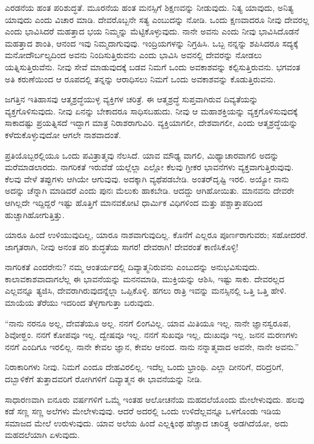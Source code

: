 ಎರಡನೆಯ ಹಂತ ಪರಿಶುದ್ಧತೆ. ಮೂರನೆಯ ಹಂತ ಮನಸ್ಸಿಗೆ ಶಿಕ್ಷಣವನ್ನು ನೀಡುವುದು. ನಿತ್ಯ ಯಾವುದು, ಅನಿತ್ಯ ಯಾವುದು ಎಂದು ವಿಚಾರ ಮಾಡಿ. ದೇವರೊಬ್ಬನೇ ಸತ್ಯ ಎಂಬುದನ್ನು ನೋಡಿ. ಒಂದು ಕ್ಷಣವಾದರೂ ನೀವು ದೇವರಲ್ಲ ಎಂದು ಭಾವಿಸಿದರೆ ಮಹತ್ತಾದ ಭಯ ನಿಮ್ಮನ್ನು ಮೆಟ್ಟಿಕೊಳ್ಳುವುದು. ನಾನೇ ಅವನು ಎಂದು ನೀವು ಭಾವಿಸಿದೊಡನೆ ಮಹತ್ತಾದ ಶಾಂತಿ, ಆನಂದ ಇವು ನಿಮ್ಮದಾಗುವುವು. ಇಂದ್ರಿಯಗಳನ್ನು ನಿಗ್ರಹಿಸಿ. ಒಬ್ಬ ನನ್ನನ್ನು ಶಪಿಸಿದರೂ ಸದ್ಯಕ್ಕೆ ಮನೋದೌರ್ಬಲ್ಯದಿಂದ ಅವನು ನಿಂದಿಸುತ್ತಿರುವನು ಎಂದು ಭಾವಿಸಿ ಅವನಲ್ಲಿ ದೇವರನ್ನು ನೋಡಲು ಯತ್ನಿಸುತ್ತಿರುವೆನು. ನೀವು ಸೇವೆ ಮಾಡುವುದಕ್ಕೆ ಬಡವ ನಿಮಗೆ ಒಂದು ಅವಕಾಶವನ್ನು ಕಲ್ಪಿಸುತ್ತಿರುವನು. ಭಗವಂತ ಅತಿ ಕರುಣೆಯಿಂದ ಆ ರೂಪದಲ್ಲಿ ತನ್ನನ್ನು ಆರಾಧಿಸಲು ನಿಮಗೆ ಒಂದು ಅವಕಾಶವನ್ನು ಕೊಡುತ್ತಿರುವನು.

ಜಗತ್ತಿನ ಇತಿಹಾಸವು ಆತ್ಮಶ್ರದ್ಧೆಯುಳ್ಳ ವ್ಯಕ್ತಿಗಳ ಚರಿತ್ರೆ. ಈ ಆತ್ಮಶ್ರದ್ಧೆ ಸುಪ್ತವಾಗಿರುವ ದಿವ್ಯತೆಯನ್ನು ವ್ಯಕ್ತಗೊಳಿಸುವುದು. ನೀವು ಏನನ್ನು ಬೇಕಾದರೂ ಸಾಧಿಸಬಹುದು. ನೀವು ಆ ಮಹಾಶಕ್ತಿಯನ್ನು ವ್ಯಕ್ತಗೊಳಿಸುವುದಕ್ಕೆ ಸಾಕಾದಷ್ಟು ಪ್ರಯತ್ನಿಸದೆ ಇದ್ದಾಗ ಮಾತ್ರ ನಿರಾಶರಾಗುವಿರಿ. ವ್ಯಕ್ತಿಯಾಗಲೀ, ದೇಶವಾಗಲೀ, ಎಂದು ಆತ್ಮಶ್ರದ್ಧೆಯನ್ನು ಕಳೆದುಕೊಳ್ಳುವುದೋ ಆಗಲೇ ನಾಶವಾದಂತೆ.

ಪ್ರತಿಯೊಬ್ಬರಲ್ಲಿಯೂ ಒಂದು ಪವಿತ್ರಾತ್ಮವು ನೆಲಸಿದೆ. ಯಾವ ಮೌಢ್ಯ ವಾಗಲಿ, ಮಿಥ್ಯಾಚಾರವಾಗಲಿ ಅದನ್ನು ಮರೆಮಾಡಲಾರದು. ನಾಗರಿಕತೆ ಇರುವೆಡೆ ಯಲ್ಲೆಲ್ಲಾ ಎಲ್ಲೋ ಕೆಲವು ಗ್ರೀಕರ ಭಾವನೆಗಳು ವ್ಯಕ್ತವಾಗುತ್ತಿರುವುವು. ಕೆಲವು ವೇಳೆ ತಪ್ಪುಗಳು ಆಗಿಯೇ ಆಗುವುವು. ಅದಕ್ಕಾಗಿ ವ್ಯಥೆಪಡಬೇಡಿ. ಅಂತರ್​ದೃಷ್ಟಿ ಇರಲಿ. ಅಯ್ಯೋ ನಾನು ಅದನ್ನು ಚೆನ್ನಾಗಿ ಮಾಡಿದರೆ ಎಂದು ಪುನಃ ಮೆಲುಕು ಹಾಕಬೇಡಿ. ಆದದ್ದು ಆಗಿಹೋಯಿತು. ಮಾನವನು ದೇವರೇ ಆಗಿಲ್ಲದೇ ಇದ್ದಿದ್ದರೆ ಇಷ್ಟು ಹೊತ್ತಿಗೆ ಮಾನವಕೋಟಿ ಧಾರ್ಮಿಕ ವಿಧಿಗಳಿಂದ ಮತ್ತು ಪಶ್ಚಾತ್ತಾಪದಿಂದ ಹುಚ್ಚಾಗಿಹೋಗುತ್ತಿತ್ತು.

ಯಾರೂ ಹಿಂದೆ ಉಳಿಯುವುದಿಲ್ಲ, ಯಾರೂ ನಾಶವಾಗುವುದಿಲ್ಲ. ಕೊನೆಗೆ ಎಲ್ಲರೂ ಪೂರ್ಣರಾಗುವರು; ಸಹೋದರರೆ. ಜಾಗೃತರಾಗಿ, ನೀವು ಅನಂತ ಪರಿ ಶುದ್ಧತೆಯ ಸಾಗರ! ದೇವರಾಗಿ! ದೇವರಂತೆ ಕಾಣಿಸಿಕೊಳ್ಳಿ!

ನಾಗರಿಕತೆ ಎಂದರೇನು? ನಮ್ಮ ಆಂತರ್ಯದಲ್ಲಿ ದಿವ್ಯಾತ್ಮನಿರುವನು ಎಂಬುದನ್ನು ಅನುಭವಿಸುವುದು. ಕಾಲಾವಕಾಶವಾದಾಗಲೆಲ್ಲ ಈ ಭಾವನೆಯನ್ನು ಮನನಮಾಡಿ, ಮುಕ್ತಿಯನ್ನು ಆಶಿಸಿ, ಇಷ್ಟು ಸಾಕು. ದೇವರಲ್ಲದ ಎಲ್ಲವನ್ನೂ ತ್ಯಜಿಸಿ, ದೇವರಾಗಿರುವುದನ್ನೆಲ್ಲಾ ಒಪ್ಪಿಕೊಳ್ಳಿ. ಹಗಲು ರಾತ್ರಿ ಇವನ್ನು ಮನಸ್ಸಿನಲ್ಲಿ ಒತ್ತಿ ಒತ್ತಿ ಹೇಳಿ. ಮಾಯೆಯ ತೆರೆಯು ಇದರಿಂದ ತೆಳ್ಳಗಾಗುತ್ತಾ ಬರುವುದು.

“ನಾನು ನರನೂ ಅಲ್ಲ, ದೇವತೆಯೂ ಅಲ್ಲ. ನನಗೆ ಲಿಂಗವಿಲ್ಲ. ಯಾವ ಮಿತಿಯೂ ಇಲ್ಲ. ನಾನೇ ಜ್ಞಾನಸ್ವರೂಪ, ಶಿವೋಠ್ಹಂ. ನನಗೆ ಕೋಪವೂ ಇಲ್ಲ. ದ್ವೇಷವೂ ಇಲ್ಲ. ನನಗೆ ಸುಖವೂ ಇಲ್ಲ, ದುಃಖವೂ ಇಲ್ಲ. ಜನನ ಮರಣಗಳು ನನಗೆ ಎಂದಿಗೂ ಇರಲಿಲ್ಲ. ನಾನೇ ಕೇವಲ ಜ್ಞಾನ, ಕೇವಲ ಆನಂದ. ನಾನು ನನ್ನಾತ್ಮವಾದ ಅವನೇ, ನಾನೇ ಅವನು.”

ನಿರಾಕಾರಿಗಳು ನೀವು. ನಿಮಗೆ ಎಂದೂ ದೇಹವಿರಲಿಲ್ಲ. ಇದೆಲ್ಲ ಒಂದು ಭ್ರಾಂಥಿ. ಎಲ್ಲಾ ದೀನರಿಗೆ, ದರಿದ್ರರಿಗೆ, ದಬ್ಬಾಳಿಕೆಗೆ ತುತ್ತಾದವರಿಗೆ ರೋಗಿಗಳಿಗೆ ದಿವ್ಯಾತ್ಮನ ಈ ಭಾವನೆಯನ್ನು ನೀಡಿ.

ಸಾಧಾರಣವಾಗಿ ಐನೂರು ವರ್ಷಗಳಿಗೆ ಒಮ್ಮೆ ಇಂತಹ ಆಲೋಚನೆಯ ಮಹದಲೆಯೊಂದು ಮೇಲೇಳುವುದು. ಹಲವು ಕಡೆ ಸಣ್ಣ ಸಣ್ಣ ಅಲೆಗಳು ಮೇಲೇಳುವುವು. ಆದರೆ ಅದರಲ್ಲಿ ಒಂದು ಉಳಿದೆಲ್ಲವನ್ನೂ ಒಳಗೊಂಡು ಇಡಿಯ ಸಮಾಜದ ಮೇಲೆ ಉರುಳುವುದು. ಯಾವ ಅಲೆಯ ಹಿಂದೆ ಎಲ್ಲಕ್ಕಿಂಥ ಹೆಚ್ಚಾದ ಚಾರಿತ್ರ್ಯ ಅಡಗಿದೆಯೋ, ಅದು ಮಹದಲೆಯಾಗಿ ಏಳುವುದು.

